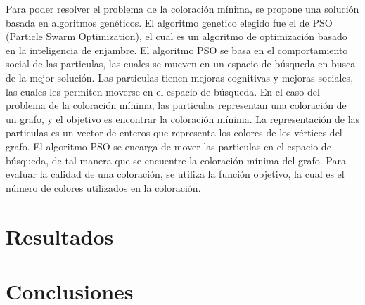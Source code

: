 \documentclass[9pt,a4paper,twoside]{tau-class/tau}
\begin{document}
    Para poder resolver el problema de la coloración mínima, se propone una solución basada en algoritmos genéticos.
    El algoritmo genetico elegido fue el de PSO (Particle Swarm Optimization), el cual es un algoritmo de optimización basado en la inteligencia de enjambre.
    El algoritmo PSO se basa en el comportamiento social de las particulas, las cuales se mueven en un espacio de búsqueda en busca de la mejor solución.
    Las particulas tienen mejoras cognitivas y mejoras sociales, las cuales les permiten moverse en el espacio de búsqueda.
    En el caso del problema de la coloración mínima, las particulas representan una coloración de un grafo, y el objetivo es encontrar la coloración mínima.
    La representación de las particulas es un vector de enteros que representa los colores de los vértices del grafo.
    El algoritmo PSO se encarga de mover las particulas en el espacio de búsqueda, de tal manera que se encuentre la coloración mínima del grafo.
    Para evaluar la calidad de una coloración, se utiliza la función objetivo, la cual es el número de colores utilizados en la coloración.

    


\section{Resultados}


\section{Conclusiones}


\printbibliography
\end{document}
